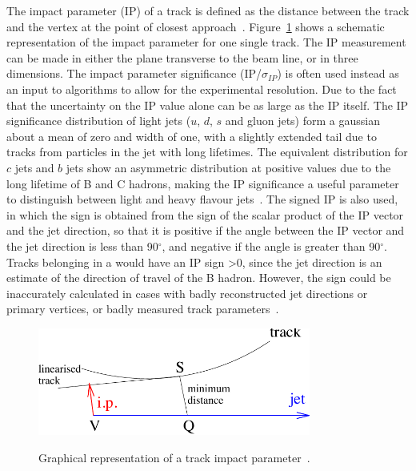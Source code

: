 The impact parameter (IP) of a track is defined as the distance between the track and the vertex at the point
of closest approach~\cite{CMS-PAS-BTV-09-001}. Figure~\ref{fig:impact_parameter} shows a schematic
representation of the impact parameter for one single track. The IP measurement can be made in either the
plane transverse to the beam line, or in three dimensions. The impact parameter significance
(IP/$\sigma_{IP}$) is often used instead as an input to \btagging algorithms to allow for the experimental
resolution. Due to the fact that the uncertainty on the IP value alone can be as large as the IP itself. The
IP significance distribution of light jets ($u$, $d$, $s$ and gluon jets) form a gaussian about a mean of zero
and width of one, with a slightly extended tail due to tracks from particles in the jet with long lifetimes.
The equivalent distribution for $c$ jets and $b$ jets show an asymmetric distribution at positive values due
to the long lifetime of B and C hadrons, making the IP significance a useful parameter to distinguish between
light and heavy flavour jets~\cite{CMS-AN-2005-041}. The signed IP is also used, in which the sign is
obtained from the sign of the scalar product of the IP vector and the jet direction, so that it is positive if the angle between the IP vector and the jet direction is less
than 90$^{\circ}$, and negative if the angle is greater than 90$^{\circ}$. Tracks belonging in a \bjet would
have an IP sign >0, since the jet direction is an estimate of the direction of travel of the B hadron.
However, the sign could be inaccurately calculated in cases with badly reconstructed jet directions or primary
vertices, or badly measured track parameters~\cite{CMS-AN-2005-041}.

\begin{figure}[hbtp]
   \centering
     \includegraphics[width=0.8\textwidth]{Chapters/02_Detector/Images/impact_parameter}\\
     \caption[Graphical representation of a track impact parameter.]{Graphical representation of a track
     impact parameter~\cite{CMS-PAS-BTV-09-001}.}
     \label{fig:impact_parameter}
\end{figure}

